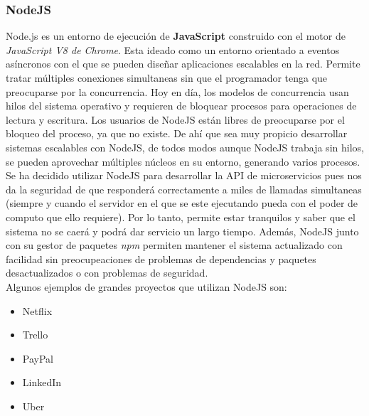 \subsubsection{NodeJS}
Node.js\cite{nodejs} es un entorno de ejecución de \textbf{JavaScript} construido con el motor de \emph{JavaScript V8 de Chrome}. Esta ideado como un entorno orientado a eventos asíncronos con el que se pueden diseñar aplicaciones escalables en la red. Permite tratar múltiples conexiones simultaneas sin que el programador tenga que preocuparse por la concurrencia. Hoy en día, los modelos de concurrencia usan hilos del sistema operativo y requieren de bloquear procesos para operaciones de lectura y escritura. Los usuarios de NodeJS están libres de preocuparse por el bloqueo del proceso, ya que no existe. De ahí que sea muy propicio desarrollar sistemas escalables con NodeJS, de todos modos aunque NodeJS trabaja sin hilos, se pueden aprovechar múltiples núcleos en su entorno, generando varios procesos. \\

Se ha decidido utilizar NodeJS para desarrollar la API de microservicios pues nos da la seguridad de que responderá correctamente a miles de llamadas simultaneas (siempre y cuando el servidor en el que se este ejecutando pueda con el poder de computo que ello requiere). Por lo tanto, permite estar tranquilos y saber que el sistema no se caerá y podrá dar servicio un largo tiempo. Además, NodeJS junto con su gestor de paquetes \emph{npm} permiten mantener el sistema actualizado con facilidad sin preocupeaciones de problemas de dependencias y paquetes desactualizados o con problemas de seguridad. \\

Algunos ejemplos de grandes proyectos que utilizan NodeJS son:
\begin{itemize}
\item Netflix
\item Trello
\item PayPal
\item LinkedIn
\item Uber
\end{itemize}

